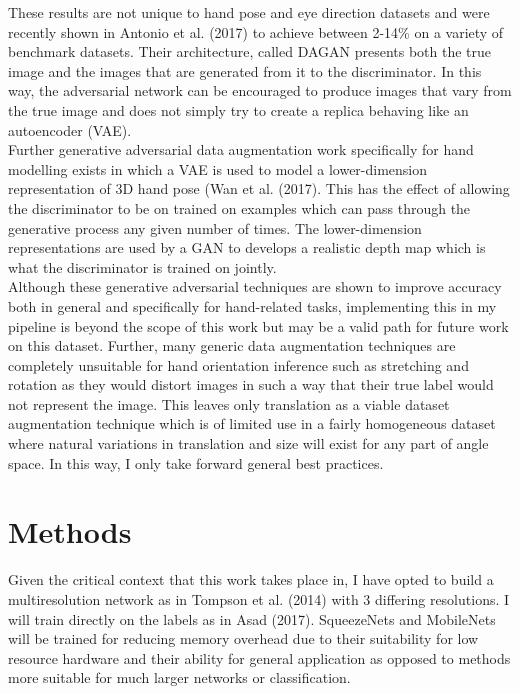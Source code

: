 \documentclass{article}
\begin{document}
These results are not unique to hand pose and eye direction datasets and were recently shown in Antonio et al. (2017) to achieve between 2-14\% on a variety of benchmark datasets. Their architecture, called DAGAN presents both the true image and the images that are generated from it to the discriminator. In this way, the adversarial network can be encouraged to produce images that vary from the true image and does not simply try to create a replica behaving like an autoencoder (VAE).\\

Further generative adversarial data augmentation work specifically for hand modelling exists in which a VAE is used to model a lower-dimension representation of 3D hand pose (Wan et al. (2017). This has the effect of allowing the discriminator to be on trained on examples which can pass through the generative process any given number of times. The lower-dimension representations are used by a GAN to develops a realistic depth map which is what the discriminator is trained on jointly. \\

Although these generative adversarial techniques are shown to improve accuracy both in general and specifically for hand-related tasks, implementing this in my pipeline is beyond the scope of this work but may be a valid path for future work on this dataset. Further, many generic data augmentation techniques are completely unsuitable for hand orientation inference such as stretching and rotation as they would distort images in such a way that their true label would not represent the image. This leaves only translation as a viable dataset augmentation technique which is of limited use in a fairly homogeneous dataset where natural variations in translation and size will exist for any part of angle space. In this way, I only take forward general best practices.

\section{Methods}

Given the critical context that this work takes place in, I have opted to build a multiresolution network as in Tompson et al. (2014) with 3 differing resolutions. I will train directly on the labels as in Asad (2017). SqueezeNets and MobileNets will be trained for reducing memory overhead due to their suitability for low resource hardware and their ability for general application as opposed to methods more suitable for much larger networks or classification. \\
\end{document}
